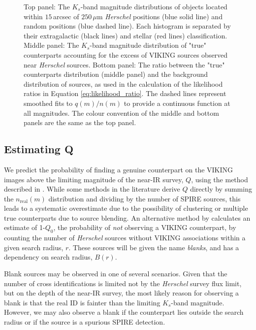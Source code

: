 \begin{figure}
	\caption[$K_s$-band distribution of counterparts, separated into galaxies and stars]{Top panel: The $K_s$-band magnitude distributions of objects located within $15\,$arcsec of $250\,\mu$m \textit{Herschel} positions (blue solid line) and random positions (blue dashed line). Each histogram is separated by their extragalactic (black lines) and stellar (red lines) classification. Middle panel: The $K_s$-band magnitude distribution of "true" counterparts accounting for the excess of VIKING sources observed near \textit{Herschel} sources. Bottom panel: The ratio between the "true" counterparts distribution (middle panel) and the background distribution of sources, as used in the calculation of the likelihood ratios in Equation \ref{eq:likelihood_ratio}. The dashed lines represent smoothed fits to $q(m)/n(m)$ to provide a continuous function at all magnitudes. The colour convention of the middle and bottom panels are the same as the top panel.}
	\label{fig:true_counterparts_distribution}
\end{figure}

\subsection{Estimating Q}

We predict the probability of finding a genuine counterpart on the VIKING images above the limiting magnitude of the near-IR survey, $Q$, using the method described in \citealt{Fleuren_2012}. While some methods in the literature derive $Q$ directly by summing the $n_{\textrm{real}}(m)$ distribution and dividing by the number of SPIRE sources, this leads to a systematic overestimate due to the possibility of clustering or multiple true counterparts due to source blending. An alternative method by \citealt{Fleuren_2012} calculates an estimate of 1-$Q_0$, the probability of \textit{not} observing a VIKING counterpart, by counting the number of \textit{Herschel} sources without VIKING associations within a given search radius, $r$. These sources will be given the name \textit{blanks}, and has a dependency on search radius, $B(r)$.

Blank sources may be observed in one of several scenarios. Given that the number of cross identifications is limited not by the \textit{Herschel} survey flux limit, but on the depth of the near-IR survey, the most likely reason for observing a blank is that the real ID is fainter than the limiting $K_s$-band magnitude. However, we may also observe a blank if the counterpart lies outside the search radius or if the source is a spurious SPIRE detection.

